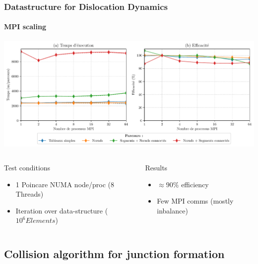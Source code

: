 \documentclass[aspectratio=1610,t,10pt]{beamer}
\begin{document}
\begin{frame}
\frametitle{Datastructure for Dislocation Dynamics}
\framesubtitle{MPI scaling}
\centering   		  		
\includegraphics[width=\textwidth]{img/bench_mesh_mpi_preview}
\begin{columns}[c]
    \begin{column}{.48\textwidth}
        \begin{block}{Test conditions}
            \begin{itemize}
                \item 1 Poincare NUMA node/proc (8 Threads)
                \item Iteration over data-structure ($10^6 Elements$)
            \end{itemize}
        \end{block}
    \end{column}
    \begin{column}{.48\textwidth}
        \begin{block}{Results}
            \begin{itemize}
                \item $\approx 90 \%$ efficiency
                \item Few MPI comms (mostly inbalance)
            \end{itemize}
        \end{block}
    \end{column}
\end{columns}
\end{frame}

\subsection{Collision algorithm for junction formation}
\end{document}
